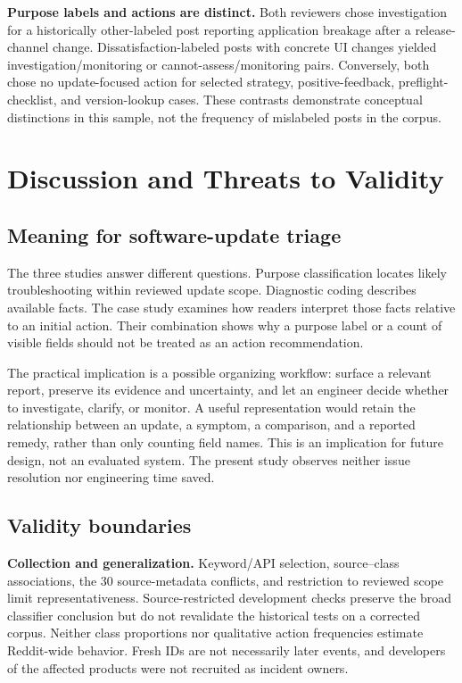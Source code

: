 \documentclass[conference,letterpaper]{IEEEtran}
\begin{document}
\textbf{Purpose labels and actions are distinct.} Both reviewers chose investigation for a historically other-labeled post reporting application breakage after a release-channel change. Dissatisfaction-labeled posts with concrete UI changes yielded investigation/monitoring or cannot-assess/monitoring pairs. Conversely, both chose no update-focused action for selected strategy, positive-feedback, preflight-checklist, and version-lookup cases. These contrasts demonstrate conceptual distinctions in this sample, not the frequency of mislabeled posts in the corpus.

\section{Discussion and Threats to Validity}
\subsection{Meaning for software-update triage}
The three studies answer different questions. Purpose classification locates likely troubleshooting within reviewed update scope. Diagnostic coding describes available facts. The case study examines how readers interpret those facts relative to an initial action. Their combination shows why a purpose label or a count of visible fields should not be treated as an action recommendation.

The practical implication is a possible organizing workflow: surface a relevant report, preserve its evidence and uncertainty, and let an engineer decide whether to investigate, clarify, or monitor. A useful representation would retain the relationship between an update, a symptom, a comparison, and a reported remedy, rather than only counting field names. This is an implication for future design, not an evaluated system. The present study observes neither issue resolution nor engineering time saved.

\subsection{Validity boundaries}
\textbf{Collection and generalization.} Keyword/API selection, source--class associations, the 30 source-metadata conflicts, and restriction to reviewed scope limit representativeness. Source-restricted development checks preserve the broad classifier conclusion but do not revalidate the historical tests on a corrected corpus. Neither class proportions nor qualitative action frequencies estimate Reddit-wide behavior. Fresh IDs are not necessarily later events, and developers of the affected products were not recruited as incident owners.
\end{document}
